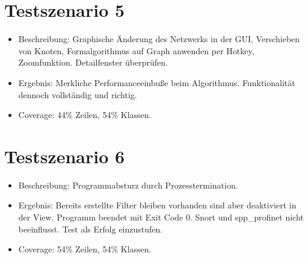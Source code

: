 \section{Testszenario 5}

\begin{itemize}
  \item Beschreibung: Graphische Änderung des Netzwerks in der GUI, Verschieben von Knoten, Formalgorithmus auf Graph anwenden per Hotkey, Zoomfunktion. Detailfenster überprüfen.
  \item Ergebnis: Merkliche Performanceeinbuße beim Algorithmus. Funktionalität dennoch vollständig und richtig.
  \item Coverage: 44\% Zeilen, 54\% Klassen.
\end{itemize}

\section{Testszenario 6}

\begin{itemize}
  \item Beschreibung: Programmabsturz durch Prozesstermination.
  \item Ergebnis: Bereits erstellte Filter bleiben vorhanden sind aber deaktiviert in der View. Programm beendet mit Exit Code 0. Snort und spp\_profinet nicht beeinflusst. Test als Erfolg einzustufen.
  \item Coverage: 54\% Zeilen, 54\% Klassen.
\end{itemize} 